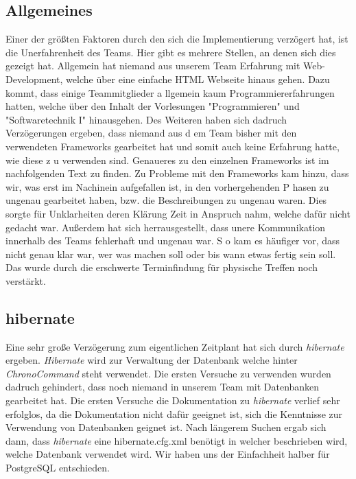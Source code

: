\subsection{Allgemeines}
Einer der größten Faktoren durch den sich die Implementierung verzögert hat, ist die Unerfahrenheit des Teams. 
Hier gibt es mehrere Stellen, an denen sich dies gezeigt hat. Allgemein hat niemand aus unserem Team Erfahrung 
mit Web-Development, welche über eine einfache HTML Webseite hinaus gehen. Dazu kommt, dass einige Teammitglieder a
llgemein kaum Programmiererfahrungen hatten, welche über den Inhalt der Vorlesungen "Programmieren" und 
"Softwaretechnik I" hinausgehen. Des Weiteren haben sich dadruch Verzögerungen ergeben, dass niemand aus d
em Team bisher mit den verwendeten Frameworks gearbeitet hat und somit auch keine Erfahrung hatte, wie diese z
u verwenden sind. Genaueres zu den einzelnen Frameworks ist im nachfolgenden Text zu finden. 
Zu Probleme mit den Frameworks kam hinzu, dass wir, was erst im Nachinein aufgefallen ist, in den vorhergehenden P
hasen zu ungenau gearbeitet haben, bzw. die Beschreibungen zu ungenau waren. Dies sorgte für Unklarheiten deren 
Klärung Zeit in Anspruch nahm, welche dafür nicht gedacht war.
Außerdem hat sich herrausgestellt, dass unere Kommunikation innerhalb des Teams fehlerhaft und ungenau war. S
o kam es häufiger vor, dass nicht genau klar war, wer was machen soll oder bis wann etwas fertig sein soll. 
Das wurde durch die erschwerte Terminfindung für physische Treffen noch verstärkt. 





\subsection{hibernate}
Eine sehr große Verzögerung zum eigentlichen Zeitplant hat sich durch \emph{hibernate} ergeben. \emph{Hibernate} wird zur Verwaltung der
Datenbank welche hinter \emph{ChronoCommand} steht verwendet. Die ersten Versuche  zu verwenden wurden dadruch
gehindert, dass noch niemand in unserem Team mit Datenbanken gearbeitet hat. Die ersten Versuche die Dokumentation zu 
\emph{hibernate} verlief sehr erfolglos, da die Dokumentation nicht dafür geeignet ist, sich die Kenntnisse zur Verwendung von
Datenbanken geignet ist. Nach längerem Suchen ergab sich dann, dass \emph{hibernate} eine hibernate.cfg.xml benötigt in welcher 
beschrieben wird, welche Datenbank verwendet wird. Wir haben uns der Einfachheit halber für PostgreSQL entschieden. 


